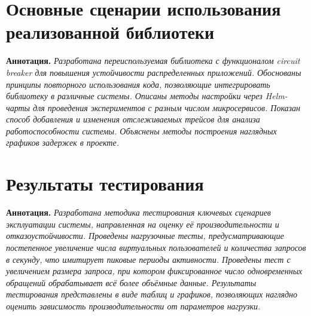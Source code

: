 












\section{Основные сценарии использования реализованной библиотеки }

\textbf{Аннотация. } \textit{ Разработана переиспользуемая библиотека с функционалом circuit breaker для повышения устойчивости распределенных приложений. Обоснованы принципы повторного использования кода, позволяющие интегрировать библиотеку в различные системы. Описаны методы настройки через Helm-чарты для проведения экспериментов с разным числом микросервисов. Показан способ добавления и изменения отслеживаемых трейсов для анализа работоспособности системы. Объяснены методы построения наглядных графиков задержек в проекте.}


\section{Результаты тестирования}

\textbf{Аннотация. } \textit{Разработана методика тестирования ключевых сценариев эксплуатации системы, направленная на оценку её производительности и отказоустойчивости. Проведены нагрузочные тесты, предусматривающие постепенное увеличение числа виртуальных пользователей и количества запросов в секунду, что имитирует пиковые периоды активности.  Проведены тест с увеличением размера запроса, при котором фиксированное число одновременных обращений обрабатывает всё более объёмные данные. Результаты тестирования представлены в виде таблиц и графиков, позволяющих наглядно оценить зависимость производительности от параметров нагрузки.}

